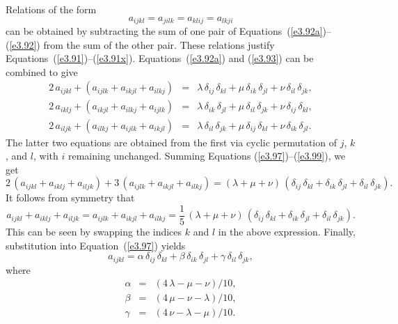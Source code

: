Relations of the form
\begin{equation}\label{e3.93}
a_{ijkl} = a_{jilk} = a_{klij}=a_{lkji}
\end{equation}
can be obtained by subtracting the sum of one pair of Equations~(\ref{e3.92a})--(\ref{e3.92}) from the sum of the other pair.
These relations justify Equations~(\ref{e3.91})--(\ref{e3.91x}). 
Equations~(\ref{e3.92a}) and (\ref{e3.93}) can be combined to give
\begin{eqnarray}\label{e3.97}
2\,a_{ijkl}+(a_{ijlk}+a_{ikjl}+a_{ilkj})&=&\lambda\,\delta_{ij}\,\delta_{kl} + \mu\,\delta_{ik}\,\delta_{jl}
+\nu\,\delta_{il}\,\delta_{jk},\\[0.5ex]
2\,a_{iklj}+(a_{ikjl}+a_{ilkj}+a_{ijlk})&=&\lambda\,\delta_{ik}\,\delta_{jl} + \mu\,\delta_{il}\,\delta_{jk}
+\nu\,\delta_{ij}\,\delta_{kl},\\[0.5ex]
2\,a_{iljk}+(a_{ilkj}+a_{ijlk}+a_{ikjl})&=&\lambda\,\delta_{il}\,\delta_{jk} + \mu\,\delta_{ij}\,\delta_{kl}
+\nu\,\delta_{ik}\,\delta_{jl}.\label{e3.99}
\end{eqnarray}
The latter two equations are obtained from the first via cyclic permutation of $j$, $k$, and $l$, with $i$ remaining unchanged.
Summing Equations (\ref{e3.97})--(\ref{e3.99}), we get
\begin{equation}
2\,(a_{ijkl}+a_{iklj}+a_{iljk}) + 3\,(a_{ijlk}+a_{ikjl} +a_{ilkj}) =(\lambda+\mu+\nu)\,(\delta_{ij}\,\delta_{kl}
+\delta_{ik}\,\delta_{jl}+\delta_{il}\,\delta_{jk}).
\end{equation}
It follows from symmetry that
\begin{equation}
a_{ijkl}+a_{iklj}+a_{iljk}= a_{ijlk}+a_{ikjl}+a_{ilkj} = \frac{1}{5}\,(\lambda+\mu+\nu)\,(\delta_{ij}\,\delta_{kl}
+\delta_{ik}\,\delta_{jl}+\delta_{il}\,\delta_{jk}).
\end{equation}
This  can be seen by swapping the indices $k$ and $l$ in the above expression.
Finally, substitution into Equation~(\ref{e3.97}) yields
\begin{equation}
a_{ijkl} = \alpha\,\delta_{ij}\,\delta_{kl} + \beta\,\delta_{ik}\,\delta_{jl}
+\gamma\,\delta_{il}\,\delta_{jk},
\end{equation}
where
\begin{eqnarray}
\alpha &=& (4\,\lambda-\mu-\nu)/10,\\[0.5ex]
\beta &=& (4\,\mu-\nu-\lambda)/10,\\[0.5ex]
\gamma &=& (4\,\nu-\lambda-\mu)/10.
\end{eqnarray}

